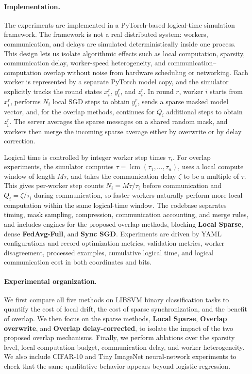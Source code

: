 \documentclass{article}
\theoremstyle{plain}
\theoremstyle{definition}
\begin{document}
\paragraph{Implementation.}
The experiments are implemented in a PyTorch-based logical-time simulation framework.
The framework is not a real distributed system: workers, communication, and delays are simulated deterministically inside one process.
This design lets us isolate algorithmic effects such as local computation, sparsity, communication delay, worker-speed heterogeneity, and communication--computation overlap without noise from hardware scheduling or networking.
Each worker is represented by a separate PyTorch model copy, and the simulator explicitly tracks the round states $x_i^r$, $y_i^r$, and $z_i^r$.
In round $r$, worker $i$ starts from $x_i^r$, performs $N_i$ local SGD steps to obtain $y_i^r$, sends a sparse masked model vector, and, for the overlap methods, continues for $Q_i$ additional steps to obtain $z_i^r$.
The server averages the sparse messages on a shared random mask, and workers then merge the incoming sparse average either by overwrite or by delay correction.

Logical time is controlled by integer worker step times $\tau_i$.
For overlap experiments, the simulator computes $\tau=\operatorname{lcm}(\tau_1,\ldots,\tau_n)$, uses a local compute window of length $M\tau$, and takes the communication delay $\zeta$ to be a multiple of $\tau$.
This gives per-worker step counts $N_i=M\tau/\tau_i$ before communication and $Q_i=\zeta/\tau_i$ during communication, so faster workers naturally perform more local computation within the same logical-time window.
The codebase separates timing, mask sampling, compression, communication accounting, and merge rules, and includes engines for the proposed overlap methods, blocking \textbf{Local Sparse}, dense \textbf{FedAvg-Full}, and \textbf{Sync SGD}.
Experiments are driven by YAML configurations and record optimization metrics, validation metrics, worker disagreement, processed examples, cumulative logical time, and logical communication cost in both coordinates and bits.

\paragraph{Experimental organization.}
We first compare all five methods on LIBSVM binary classification tasks to quantify the cost of local drift, the cost of sparse synchronization, and the benefit of overlap. 
We then focus on the sparse methods, \textbf{Local Sparse}, \textbf{Overlap overwrite}, and \textbf{Overlap delay-corrected}, to isolate the impact of the two proposed overlap mechanisms. 
Finally, we perform ablations over the sparsity level, local computation budget, communication delay, and worker heterogeneity.
We also include CIFAR-10 and Tiny ImageNet neural-network experiments to check that the same qualitative behavior appears beyond logistic regression.
\end{document}

